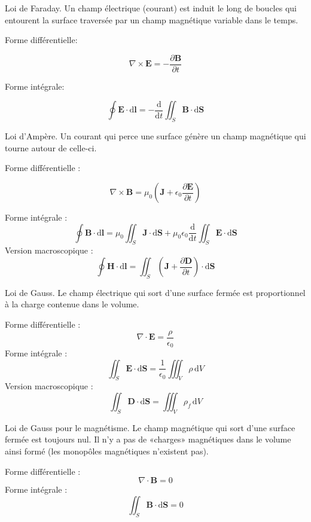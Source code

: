 Loi de Faraday. Un champ électrique (courant) est induit le long de boucles qui entourent la surface traversée par un champ magnétique variable dans le temps.

Forme différentielle:

\[
\nabla \times \boldsymbol{E} = - \frac{\partial{\boldsymbol{B}}}{\partial{t}}\]

Forme intégrale:

\[
\oint \boldsymbol{E} \cdot \mathrm{d}\boldsymbol{l} = -\frac{\mathrm{d}}{\mathrm{d}t} \iint_S \boldsymbol{B}\cdot \mathrm{d}\boldsymbol{S}
\]

Loi d’Ampère. Un courant qui perce une surface génère un champ magnétique qui tourne autour de celle-ci.

Forme différentielle :

\[
\nabla \times \boldsymbol{B} = \mu_0 \left( \boldsymbol{J} + \epsilon_0 \frac{\partial{\boldsymbol{E}}}{\partial{t}} \right)
\]


Forme intégrale :
\[\oint \boldsymbol{B} \cdot \mathrm{d}\boldsymbol{l} = \mu_0 \iint_S \boldsymbol{J}\cdot\mathrm{d}\boldsymbol{S} + \mu_0 \epsilon_0 \frac{\mathrm{d}}{\mathrm{d}t} \iint_S \boldsymbol{E}\cdot \mathrm{d}\boldsymbol{S}\]
Version macroscopique :
\[\oint \boldsymbol{H} \cdot \mathrm{d}\boldsymbol{l} = \iint_S \left( \boldsymbol{J} + \frac{\partial\boldsymbol{D}}{\partial t} \right) \cdot \mathrm{d}\boldsymbol{S}\]

Loi de Gauss. 
Le champ électrique qui sort d’une surface fermée est proportionnel à la charge contenue dans le volume.

Forme différentielle :
\[\nabla \cdot \boldsymbol{E} = \frac{\rho}{\epsilon_0}\]
Forme intégrale :
\[\iint_{S} \boldsymbol{E} \cdot \mathrm{d}\boldsymbol{S} = \frac{1}{\epsilon_0} \iiint_V \rho \,\mathrm{d}V\]
Version macroscopique :
\[\iint_{S} \boldsymbol{D} \cdot \mathrm{d}\boldsymbol{S} = \iiint_V \rho_f \,\mathrm{d}V\]

Loi de Gauss pour le magnétisme. 
Le champ magnétique qui sort d’une surface fermée est toujours nul. Il n’y a pas de «charges» magnétiques dans le volume ainsi formé (les monopôles magnétiques n’existent pas).

Forme différentielle :
\[\nabla \cdot \boldsymbol{B} = 0\]
Forme intégrale :
\[\iint_{S} \boldsymbol{B} \cdot\mathrm{d}\boldsymbol{S} = 0\]



